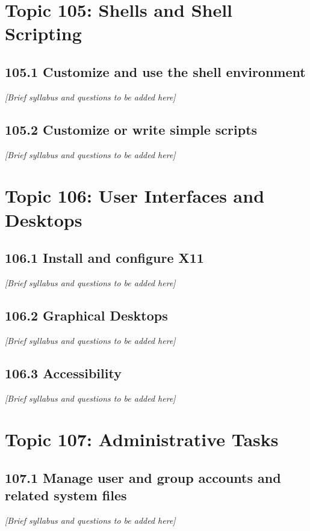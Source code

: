 \documentclass[12pt,a4paper]{report}
\begin{document}
\chapter{Topic 105: Shells and Shell Scripting}
\section{105.1 Customize and use the shell environment}
\textit{[Brief syllabus and questions to be added here]}

\section{105.2 Customize or write simple scripts}
\textit{[Brief syllabus and questions to be added here]}

\chapter{Topic 106: User Interfaces and Desktops}
\section{106.1 Install and configure X11}
\textit{[Brief syllabus and questions to be added here]}

\section{106.2 Graphical Desktops}
\textit{[Brief syllabus and questions to be added here]}

\section{106.3 Accessibility}
\textit{[Brief syllabus and questions to be added here]}

\chapter{Topic 107: Administrative Tasks}
\section{107.1 Manage user and group accounts and related system files}
\textit{[Brief syllabus and questions to be added here]}
\end{document}
